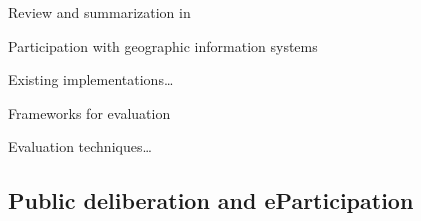 Review and summarization in \cite{Saebo_eParticipation,Medaglia2012_eParticipation}


Participation with geographic information systems \cite{zhao2006geodf} \cite{Tang2005_PPGIS_discussion_forum} \cite{Rinner_ArgumentationMaps} \cite{Schlossberg2005_PPGIS} \cite{densham_sdss} \cite{Jankowski2005_community_based_pgis} \cite{Longueville2010_community_based_geoportals_web20} \cite{Rinner2009_Web2_argumap} \cite{sidlar_argumap_2007} \cite{Simao2009Webbased} \cite{Voss2004_Evolution_PGIS} \cite{Blaschke2004_PGIS_critically_revised} \cite{Sieber2006_PublicParticipationGIS}


Existing implementations\dots \cite{Rinner2007_geovis_decisionsupport} \cite{Boroushaki2010_ParticipatoryGIS} \cite{Kessler2005_ArgumentationMapPrototype} \cite{Kessler2005_Conflict_Resolution} \cite{Meng2010_ArgooMap_evaluation} \cite{Meng2010_WebPPGIS_Usability} \cite{Sani2011_Scalable_Argumap}


Frameworks for evaluation \cite{Walker2013Qualitative}

Evaluation techniques\dots 


\subsection{Public deliberation and eParticipation}

